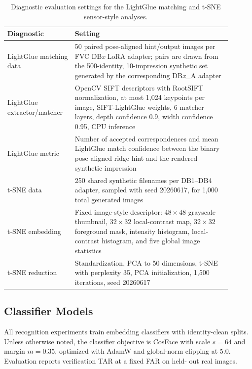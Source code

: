 \documentclass{article}
\begin{document}
\begin{table}[!htbp]
    \centering
    \small
    \caption{Diagnostic evaluation settings for the LightGlue matching and
    t-SNE sensor-style analyses.}
    \label{tab:appendix_diagnostic_hparams}
    \setlength{\tabcolsep}{5pt}
    \renewcommand{\arraystretch}{1.05}
    \begin{tabular}{p{0.26\linewidth}|p{0.64\linewidth}}
        \toprule
        Diagnostic & Setting \\
        \midrule
        LightGlue matching data
        & 50 paired pose-aligned hint/output images per FVC DB\emph{x} LoRA
        adapter; pairs are drawn from the 500-identity, 10-impression
        synthetic set generated by the corresponding DB\emph{x}\_A adapter \\
        LightGlue extractor/matcher
        & OpenCV SIFT descriptors with RootSIFT normalization, at most 1,024
        keypoints per image, SIFT-LightGlue weights, 6 matcher layers, depth
        confidence 0.9, width confidence 0.95, CPU inference \\
        LightGlue metric
        & Number of accepted correspondences and mean LightGlue match
        confidence between the binary pose-aligned ridge hint and the rendered
        synthetic impression \\
        t-SNE data
        & 250 shared synthetic filenames per DB1--DB4 adapter, sampled with
        seed 20260617, for 1,000 total generated images \\
        t-SNE embedding
        & Fixed image-style descriptor: $48\times48$ grayscale thumbnail,
        $32\times32$ local-contrast map, $32\times32$ foreground mask,
        intensity histogram, local-contrast histogram, and five global image
        statistics \\
        t-SNE reduction
        & Standardization, PCA to 50 dimensions, t-SNE with perplexity 35,
        PCA initialization, 1,500 iterations, seed 20260617 \\
        \bottomrule
    \end{tabular}
\end{table}
\FloatBarrier

\subsection{Classifier Models}

All recognition experiments train embedding classifiers with identity-clean
splits.  Unless otherwise noted, the classifier objective is CosFace with
scale $s=64$ and margin $m=0.35$, optimized with AdamW and global-norm
clipping at 5.0.  Evaluation reports verification TAR at a fixed FAR on held-
out real images.
\end{document}
